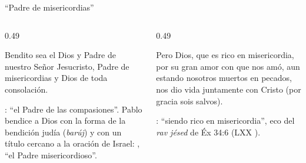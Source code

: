 \begin{frame}{``Padre de misericordias''}
\begin{columns}[t,onlytextwidth]
\begin{column}{0.49\textwidth}
\begin{cita}Bendito sea el Dios y Padre de nuestro Señor Jesucristo, Padre de misericordias y Dios de toda consolación.\end{cita}
\scriptsize{}: ``el Padre de las compasiones''. Pablo bendice a Dios con la forma de la bendición judía (\emph{barúj}) y con un título cercano a la oración de Israel: , ``el Padre misericordioso''.
\end{column}
\begin{column}{0.49\textwidth}
\begin{cita}Pero Dios, que es rico en misericordia, por su gran amor con que nos amó, aun estando nosotros muertos en pecados, nos dio vida juntamente con Cristo (por gracia sois salvos).\end{cita}
\scriptsize{}: ``siendo rico en misericordia'', eco del \emph{rav jésed} de Éx 34:6 (LXX ).
\end{column}
\end{columns}\par\smallskip
{}
\end{frame}

